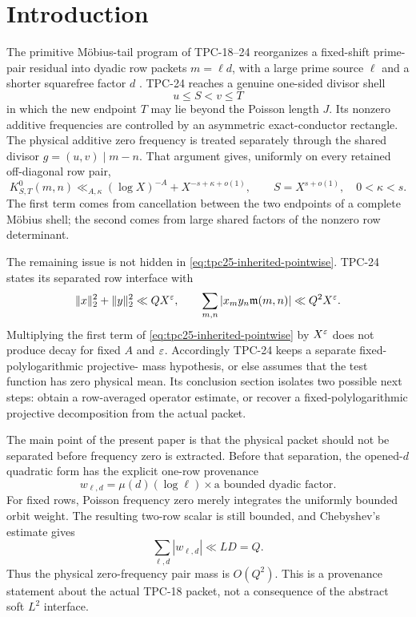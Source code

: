 \section{Introduction}
\label{sec:tpc25-introduction}

The primitive M\"obius-tail program of TPC-18--24 reorganizes a
fixed-shift prime-pair residual into dyadic row packets
\(m=\ell d\), with a large prime source \(\ell\) and a shorter
squarefree factor \(d\) \citep{WangTPC18,WangTPC19,WangTPC20,WangTPC21,WangTPC22,WangTPC23,WangTPC24}.
TPC-24 reaches a genuine one-sided divisor shell
\[
 u\le S<v\le T
\]
in which the new endpoint \(T\) may lie beyond the Poisson length
\(J\).  Its nonzero additive frequencies are controlled by an
asymmetric exact-conductor rectangle.  The physical additive zero
frequency is treated separately through the shared divisor
\(g=(u,v)\mid m-n\).  That argument gives, uniformly on every retained
off-diagonal row pair,
\begin{equation}
 K^0_{S,T}(m,n)
 \ll_{A,\kappa}
 (\log X)^{-A}+X^{-s+\kappa+o(1)},
 \qquad S=X^{s+o(1)},\quad 0<\kappa<s.
 \label{eq:tpc25-inherited-pointwise}
\end{equation}
The first term comes from cancellation between the two endpoints of a
complete M\"obius shell; the second comes from large shared factors of
the nonzero row determinant.

The remaining issue is not hidden in \eqref{eq:tpc25-inherited-pointwise}.
TPC-24 states its separated row interface with
\[
 \|x\|_2^2+\|y\|_2^2\ll QX^\varepsilon,
 \qquad
 \sum_{m,n}|x_my_n\mathfrak m(m,n)|\ll Q^2X^\varepsilon.
\]
Multiplying the first term of \eqref{eq:tpc25-inherited-pointwise} by
\(X^\varepsilon\) does not produce decay for fixed \(A\) and \(\varepsilon\).
Accordingly TPC-24 keeps a separate fixed-polylogarithmic projective-
mass hypothesis, or else assumes that the test function has zero
physical mean.  Its conclusion section isolates two possible next
steps: obtain a row-averaged operator estimate, or recover a
fixed-polylogarithmic projective decomposition from the actual packet.

The main point of the present paper is that the physical packet should
not be separated before frequency zero is extracted.  Before that
separation, the opened-\(d\) quadratic form has the explicit one-row
provenance
\begin{equation}
 w_{\ell,d}=\mu(d)(\log\ell)\times
 \text{a bounded dyadic factor}.
 \label{eq:tpc25-row-provenance-preview}
\end{equation}
For fixed rows, Poisson frequency zero merely integrates the uniformly
bounded orbit weight.  The resulting two-row scalar is still bounded,
and Chebyshev's estimate gives
\begin{equation}
 \sum_{\ell,d}|w_{\ell,d}|\ll LD=Q.
 \label{eq:tpc25-row-mass-preview}
\end{equation}
Thus the physical zero-frequency pair mass is \(O(Q^2)\).  This is a
provenance statement about the actual TPC-18 packet, not a consequence
of the abstract soft \(L^2\) interface.

